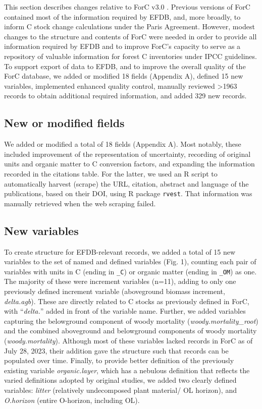 \documentclass[, manuscript]{copernicus}
\begin{document}
This section describes changes relative to ForC v3.0
\citep{anderson-teixeira_carbon_2021}. Previous versions of ForC
\citep{anderson-teixeira_carbon_2016, anderson-teixeira_forc_2018, anderson-teixeira_carbon_2021}
contained most of the information required by EFDB, and, more broadly,
to inform C stock change calculations under the Paris Agreement.
However, modest changes to the structure and contents of ForC were
needed in order to provide all information required by EFDB and to
improve ForC's capacity to serve as a repository of valuable information
for forest C inventories under IPCC guidelines. To support export of
data to EFDB, and to improve the overall quality of the ForC database,
we added or modified 18 fields (Appendix A), defined 15 new variables,
implemented enhanced quality control, manually reviewed \textgreater1963
records to obtain additional required information, and added 329 new
records.

\subsection{New or modified fields}

We added or modified a total of 18 fields (Appendix A). Most notably,
these included improvement of the representation of uncertainty,
recording of original units and organic matter to C conversion factors,
and expanding the information recorded in the citations table. For the
latter, we used an R script to automatically harvest (scrape) the URL,
citation, abstract and language of the publications, based on their DOI,
using R package \texttt{rvest}\citep{wickham_rvest_2022}. That
information was manually retrieved when the web scraping failed.

\subsection{New variables}

To create structure for EFDB-relevant records, we added a total of 15
new variables to the set of named and defined variables (Fig. 1),
counting each pair of variables with units in C (ending in \texttt{\_C})
or organic matter (ending in \texttt{\_OM}) as one. The majority of
these were increment variables (n=11), adding to only one previously
defined increment variable (aboveground biomass increment,
\emph{delta.agb}). These are directly related to C stocks as previously
defined in ForC, with ``\emph{delta.}'' added in front of the variable
name. Further, we added variables capturing the belowground component of
woody mortality (\emph{woody.mortality\_root}) and the combined
aboveground and belowground components of woody mortality
(\emph{woody.mortality}). Although most of these variables lacked
records in ForC as of July 28, 2023, their addition gave the structure
such that records can be populated over time. Finally, to provide better
definition of the previously existing variable \emph{organic.layer},
which has a nebulous definition that reflects the varied definitions
adopted by original studies, we added two clearly defined variables:
\emph{litter} (relatively undecomposed plant material/ OL horizon), and
\emph{O.horizon} (entire O-horizon, including OL).
\end{document}
